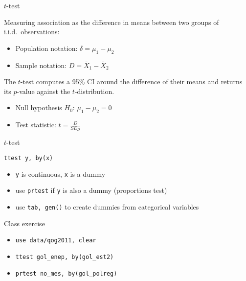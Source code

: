 \documentclass[t]{beamer}
\begin{document}
	\begin{frame}{$t$-test}
		
		\begin{block}{Measuring association as the difference in means between two groups of i.i.d.~observations:}
		
			\begin{itemize}
				\item Population notation:
				$\delta = \mu_1 - \mu_2$

				\item Sample notation:
				$D = \bar X_1 - \bar X_2$
			\end{itemize}

		\end{block}
		
		\begin{block}{The $t$-test computes a 95\% CI around the difference of their means and returns its $p$-value against the $t$-distribution.}
		
			\begin{itemize}
				\item Null hypothesis $H_0$:
				$\mu_1 - \mu_2 = 0$
			
				\item Test statistic:
				$t = \frac{D}{SE_D}$
			\end{itemize}

		\end{block}
		
	\end{frame}
	
	\begin{frame}[t]{$t$-test}
		
		\begin{block}{\texttt{ttest y, by(x)}}

			\begin{itemize}
				\item \texttt{y} is continuous, \texttt{x} is a dummy
				\item use \texttt{prtest} if \texttt{y} is also a dummy (proportions test)
				\item use \texttt{tab, gen()} to create dummies from categorical variables
			\end{itemize}

		\end{block}

        \begin{exampleblock}{Class exercise}
								
					\begin{itemize}
						\item \texttt{use data/qog2011, clear}
						\item \texttt{ttest gol\_enep, by(gol\_est2)}
						\item \texttt{prtest no\_mes, by(gol\_polreg)}
					\end{itemize}
			
        \end{exampleblock}
	
	\end{frame}
	
\end{document}
